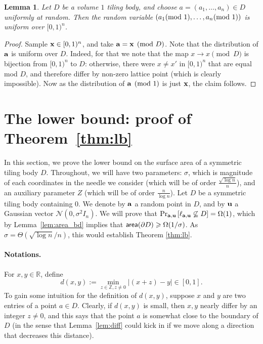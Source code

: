 \documentclass[10pt,a4paper]{article}
\newtheorem{lemma}[thm]{Lemma}
\newcommand\Prob[2]{{\Pr_{#1}\left[ {#2} \right]}}
\renewcommand\geq{\geqslant}
\newcommand{\ZZ}{\mathbb{Z}}
\begin{document}
\begin{lemma}\label{lem:uniform}
  Let $D$ be a volume $1$ tiling body, and choose $a=(a_1,\ldots,a_n)\in D$ uniformly
  at random. Then the random variable $(a_1\hspace{-1ex}\pmod{1},\ldots,a_n\hspace{-1ex}\pmod{1})$ is uniform over $[0,1)^n$.
\end{lemma}
\begin{proof}
  Sample ${\bf x}\in[0,1)^n$, and take ${\bf a} = {\bf x} \pmod{D}$. Note that the distribution of
  ${\bf a}$ is uniform over $D$. Indeed, for that we note that the map $x\to x\pmod{D}$ is bijection from
  $[0,1)^n$ to $D$:
  otherwise, there were $x\neq x'$ in $[0,1)^n$ that are equal mod $D$, and therefore differ by non-zero lattice point
  (which is clearly impossible). Now as the distribution of ${\bf a}\pmod{1}$ is just ${\bf x}$, the claim follows.
  \end{proof}


\section{The lower bound: proof of Theorem~\ref{thm:lb}}\label{sec:lb}

In this section, we prove the lower bound on the surface area of a
symmetric tiling body $D$.
Throughout, we will have two parameters: $\sigma$, which is magnitude of each coordinates in the needle we consider
(which will be of order $\frac{\sqrt{\log n}}{n}$), and an auxiliary parameter $Z$ (which will be of order $\frac{n}{\log n}$).
Let $D$ be a symmetric tiling body containing $0$.
We denote by ${\bf a}$ a random point in $D$,
and by ${\bf u}$ a Gaussian vector $\mathcal{N}(0,\sigma^2 I_n)$. We will prove that
$\Prob{{\bf a}, {\bf u}}{\ell_{{\bf a},{\bf u}}\not\subseteq D} = \Omega(1)$,
which by Lemma~\ref{lem:area_bd} implies that ${\sf area}(\partial D)\geq \Omega(1/\sigma)$. As
$\sigma = \Theta(\sqrt{\log n}/n)$, this would establish Theorem \ref{thm:lb}.

\paragraph{Notations.}
For $x,y\in\mathbb{R}$, define
\[
d(x,y):= \min_{z\in \ZZ, z\neq 0} |(x+z)-y|\in [0,1].
\]
To gain some intuition for the definition of $d(x,y)$, suppose $x$ and $y$ are two entries of a point $a\in D$.
Clearly, if $d(x,y)$ is small, then $x,y$ nearly differ by an integer $z\neq 0$, and this says that the point $a$ is
somewhat close to the boundary of $D$ (in the sense that Lemma~\ref{lem:diff} could kick in if we move along a direction
that decreases this distance).
\end{document}
